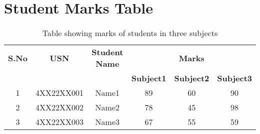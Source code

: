 \documentclass{article}
\begin{document}
\section*{Student Marks Table}
\begin{table}[h!]
\centering
\begin{tabular}{|c|c|c|c|c|c|}
\hline
\textbf{S.No} & \textbf{USN} & \textbf{Student Name} & \multicolumn{3}{c|}{\textbf{Marks}} \\
\cline{4-6}
& & & \textbf{Subject1} & \textbf{Subject2} & \textbf{Subject3} \\
\hline
1 & 4XX22XX001 & Name1 & 89 & 60 & 90 \\
\hline
2 & 4XX22XX002 & Name2 & 78 & 45 & 98 \\
\hline
3 & 4XX22XX003 & Name3 & 67 & 55 & 59 \\
\hline
\end{tabular}
\caption{Table showing marks of students in three subjects}
\end{table}
\end{document}

